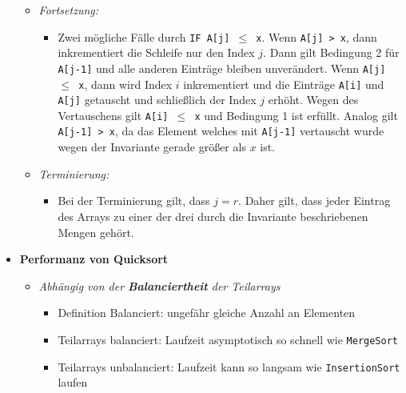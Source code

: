 \documentclass[
    ngerman,
    color=3b,
    load_common, %
    summary,
    boxarc,
]{tuda_summary}
\begin{document}
\begin{itemize}
\begin{itemize}
              \item \textit{Fortsetzung:}
                    \begin{itemize}
                        \item[]
                              Zwei mögliche Fälle durch \texttt{IF A[j] $\leq$ x}. Wenn \texttt{A[j] > x}, dann inkrementiert die
                              Schleife nur den Index $j$. Dann gilt Bedingung 2 für \texttt{A[j-1]} und alle anderen Einträge
                              bleiben unverändert. Wenn \texttt{A[j] $\leq$ x}, dann wird Index $i$ inkrementiert und die
                              Einträge \texttt{A[i]} und \texttt{A[j]} getauscht und schließlich der Index $j$ erhöht. Wegen
                              des Vertauschens gilt \texttt{A[i] $\leq$ x} und Bedingung 1 ist erfüllt. Analog gilt
                              \texttt{A[j-1] > x}, da das Element welches mit \texttt{A[j-1]} vertauscht wurde wegen der
                              Invariante gerade größer als $x$ ist.
                    \end{itemize}

              \item \textit{Terminierung:}
                    \begin{itemize}
                        \item[]
                              Bei der Terminierung gilt, dass $j = r$. Daher gilt, dass jeder Eintrag des Arrays zu einer der drei
                              durch die Invariante beschriebenen Mengen gehört.
                    \end{itemize}
          \end{itemize}

    \item \textbf{Performanz von Quicksort}
          \begin{itemize}
              \item \textit{Abhängig von der \textbf{Balanciertheit} der Teilarrays}
                    \begin{itemize}
                        \item Definition Balanciert: ungefähr gleiche Anzahl an Elementen
                        \item Teilarrays balanciert: Laufzeit asymptotisch so schnell wie \texttt{MergeSort}
                        \item Teilarrays unbalanciert: Laufzeit kann so langsam wie \texttt{InsertionSort} laufen
                    \end{itemize}


\end{itemize}
\end{itemize}
\end{document}
